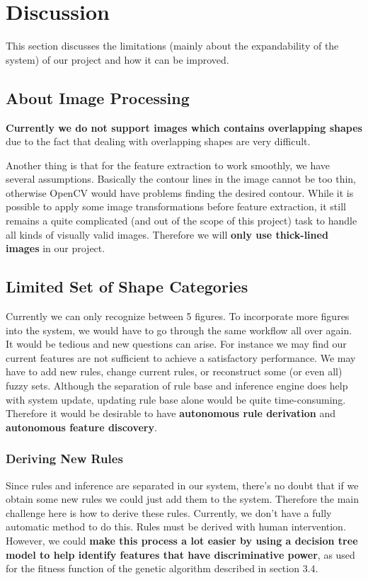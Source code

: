 \section{Discussion}

This section discusses the limitations (mainly about the expandability of the system) of our project and how it can be improved.


\subsection{About Image Processing}

\textbf{Currently we do not support images which contains overlapping shapes} due to the fact that dealing with overlapping shapes are very difficult.

Another thing is that for the feature extraction to work smoothly, we have several assumptions. Basically the contour lines in the image cannot be too thin, otherwise OpenCV would have problems finding the desired contour. While it is possible to apply some image transformations before feature extraction, it still remains a quite complicated (and out of the scope of this project) task to handle all kinds of visually valid images. Therefore we will \textbf{only use thick-lined images} in our project.

\subsection{Limited Set of Shape Categories}

Currently we can only recognize between 5 figures. To incorporate more figures into the system, we would have to go through the same workflow all over again. It would be tedious and new questions can arise. For instance we may find our current features are not sufficient to achieve a satisfactory performance. We may have to add new rules, change current rules, or reconstruct some (or even all) fuzzy sets. Although the separation of rule base and inference engine does help with system update, updating rule base alone would be quite time-consuming. Therefore it would be desirable to have \textbf{autonomous rule derivation} and \textbf{autonomous feature discovery}.

\subsubsection{Deriving New Rules}

Since rules and inference are separated in our system, there's no doubt that if we obtain some new rules we could just add them to the system. Therefore the main challenge here is how to derive these rules. Currently, we don't have a fully automatic method to do this. Rules must be derived with human intervention. However, we could \textbf{make this process a lot easier by using a decision tree model to help identify features that have discriminative power}, as used for the fitness function of the genetic algorithm described in section 3.4.

